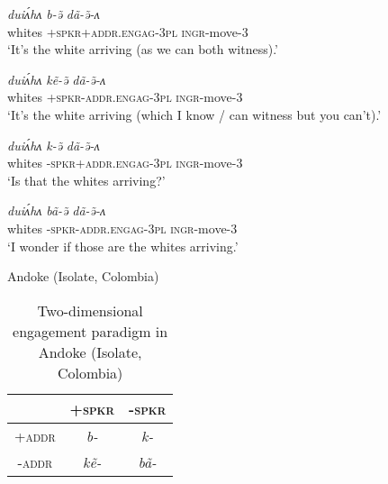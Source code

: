 \begin{exe}
\ex\label{ex:EngagementIntro}
\begin{xlist}
\ex 
\gll \textit{duiʌ́hʌ} \textit{b-ə̃} \textit{dã-ə̃-ʌ} \\
whites \textsc{+spkr+addr.engag-3pl} \textsc{ingr}-move-3 \\
\glt `It's the white arriving (as we can both witness).'

\ex 
\gll \textit{duiʌ́hʌ} \textit{kẽ-ə̃} \textit{dã-ə̃-ʌ} \\
whites \textsc{+spkr-addr.engag-3pl} \textsc{ingr}-move-3 \\
\glt `It's the white arriving (which I know / can witness but you can't).'

\ex
\gll \textit{duiʌ́hʌ} \textit{k-ə̃} \textit{dã-ə̃-ʌ} \\
whites \textsc{-spkr+addr.engag-3pl} \textsc{ingr}-move-3 \\
\glt `Is that the whites arriving?'

\ex
\gll \textit{duiʌ́hʌ} \textit{bã-ə̃} \textit{dã-ə̃-ʌ} \\
whites \textsc{-spkr-addr.engag-3pl} \textsc{ingr}-move-3 \\
\glt `I wonder if those are the whites arriving.'

\end{xlist}
Andoke (Isolate, Colombia) \cite[115-116]{EvansBergqvistSanRoque2018a}
\end{exe}

\begin{table}[t]
\centering

\caption{Two-dimensional engagement paradigm in Andoke (Isolate, Colombia) \cite[115-116]{EvansBergqvistSanRoque2018a}}
    \begin{tabular}{c|c|c}
         & \textsc{+spkr} & \textsc{-spkr} \\
         \hline
        \textsc{+addr} & \textit{b-} & \textit{k-} \\
        \hline
        \textsc{-addr} & \textit{kẽ-} & \textit{bã-} \\
    \end{tabular}

\label{tab:EngagementAndoke}
\end{table}

